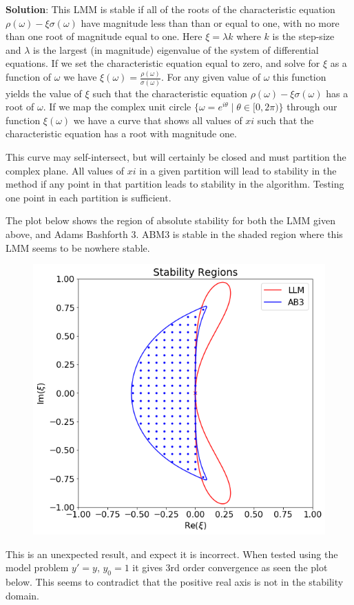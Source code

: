 \documentclass[final,oneside,onecolumn]{article}
\begin{document}
\begin{enumerate}
\bigbreak
{\large \bf Solution}: This LMM is stable if all of the roots of the characteristic equation $\rho(\omega) - \xi \sigma(\omega)$ have magnitude less than than or equal to one, with no more than one root of magnitude equal to one. Here $\xi = \lambda k$ where $k$ is the step-size and $\lambda$ is the largest (in magnitude) eigenvalue of the system of differential equations. If we set the characteristic equation equal to zero, and solve for $\xi$ as a function of $\omega$ we have $\xi(\omega) = \frac{\rho(\omega)}{\sigma(\omega)}$. For any given value of $\omega$ this function yields the value of $\xi$ such that the characteristic equation $\rho(\omega) - \xi \sigma(\omega)$ has a root of $\omega$. If we map the complex unit circle $\{\omega = e^{i\theta} \mid \theta \in [0, 2\pi)\}$ through our function $\xi(\omega)$ we have a curve that shows all values of $xi$ such that the characteristic equation has a root with magnitude one.
\bigbreak

This curve may self-intersect, but will certainly be closed and must partition the complex plane. All values of $xi$ in a given partition will lead to stability in the method if any point in that partition leads to stability in the algorithm. Testing one point in each partition is sufficient. 
\bigbreak

The plot below shows the region of absolute stability for both the LMM given above, and Adams Bashforth  3. ABM3 is stable in the shaded region where this LMM seems to be nowhere stable. 

\begin{figure}[H]
	\centering
	\includegraphics[width=.6\linewidth]{hw5_p4_stability}
\end{figure}

This is an unexpected result, and expect it is incorrect. When tested using the model problem $y' = y$, $y_0 = 1$ it gives 3rd order convergence as seen the plot below. This seems to contradict that the positive real axis is not in the stability domain. 


\end{enumerate}
\end{document}
